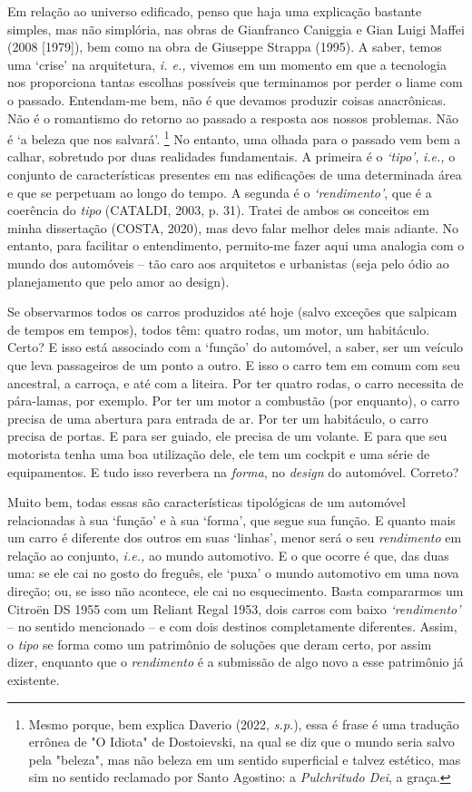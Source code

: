 \documentclass[]{report}
\begin{document}
	Em relação ao universo edificado, penso que haja uma explicação bastante simples, mas não simplória, nas obras de Gianfranco Caniggia e Gian Luigi Maffei (2008 [1979]), bem como na obra de Giuseppe Strappa (1995). A saber, temos uma `crise' na arquitetura, \textit{i. e.,} vivemos em um momento em que a tecnologia nos proporciona tantas escolhas possíveis que terminamos por perder o liame com o passado. Entendam-me bem, não é que devamos produzir coisas anacrônicas. Não é o romantismo do retorno ao passado a resposta aos nossos problemas. Não é `a beleza que nos salvará'.
		\footnote[3]{Mesmo porque, bem explica Daverio (2022, \textit{s.p.}), essa é frase é uma tradução errônea de "O Idiota" de Dostoievski, na qual se diz que o mundo seria salvo pela "beleza", mas não beleza em um sentido superficial e talvez estético, mas sim no sentido reclamado por Santo Agostino: a \textit{Pulchritudo Dei}, a graça.} 
	No entanto, uma olhada para o passado vem bem a calhar, sobretudo por duas realidades fundamentais. A primeira é o \textit{`tipo'}, \textit{i.e.,} o conjunto de características presentes em nas edificações de uma determinada área e que se perpetuam ao longo do tempo. A segunda é o \textit{`rendimento'}, que é a coerência do \textit{tipo} (CATALDI, 2003, p. 31). Tratei de ambos os conceitos em minha dissertação (COSTA, 2020), mas devo falar melhor deles mais adiante. No entanto, para facilitar o entendimento, permito-me fazer aqui uma analogia com o mundo dos automóveis – tão caro aos arquitetos e urbanistas (seja pelo ódio ao planejamento que pelo amor ao design). 
	
	Se observarmos todos os carros produzidos até hoje (salvo exceções que salpicam de tempos em tempos), todos têm: quatro rodas, um motor, um habitáculo. Certo? E isso está associado com a `função' do automóvel, a saber, ser um veículo que leva passageiros de um ponto a outro. E isso o carro tem em comum com seu ancestral, a carroça, e até com a liteira. Por ter quatro rodas, o carro necessita de pára-lamas, por exemplo. Por ter um motor a combustão (por enquanto), o carro precisa de uma abertura para entrada de ar. Por ter um habitáculo, o carro precisa de portas. E para ser guiado, ele precisa de um volante. E para que seu motorista tenha uma boa utilização dele, ele tem um cockpit e uma série de equipamentos. E tudo isso reverbera na \textit{forma}, no \textit{design} do automóvel. Correto? 
	
	Muito bem, todas essas são características tipológicas de um automóvel relacionadas à sua `função' e à sua `forma', que segue sua função. E quanto mais um carro é diferente dos outros em suas `linhas', menor será o seu \textit{rendimento} em relação ao conjunto, \textit{i.e.,} ao mundo automotivo. E o que ocorre é que, das duas uma: se ele cai no gosto do freguês, ele `puxa' o mundo automotivo em uma nova direção; ou, se isso não acontece, ele cai no esquecimento. Basta compararmos um Citroën DS 1955 com um Reliant Regal 1953, dois carros com baixo \textit{`rendimento'} – no sentido mencionado – e com dois destinos completamente diferentes. Assim, o \textit{tipo} se forma como um patrimônio de soluções que deram certo, por assim dizer, enquanto que o \textit{rendimento} é a submissão de algo novo a esse patrimônio já existente.
	
\end{document}
